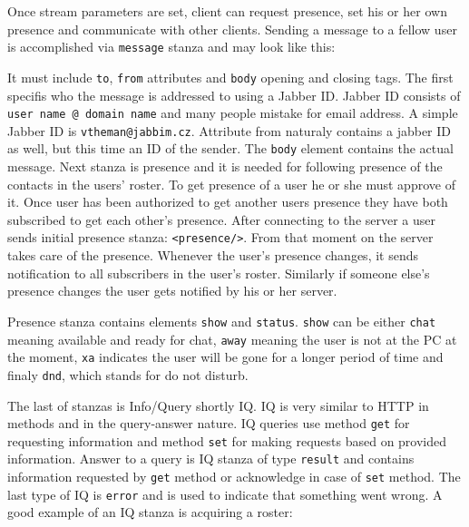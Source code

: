 

Once stream parameters are set, client can request presence, set his or her own presence and communicate with other clients. Sending a message to a fellow user is accomplished via \verb|message| stanza and may look like this:



It must include \verb|to|, \verb|from| attributes and \verb|body| opening and closing tags. The first specifis who the message is addressed to using a Jabber ID. Jabber ID consists of \verb|user name @ domain name| and many people mistake for email address. A simple Jabber ID is \verb|vtheman@jabbim.cz|. Attribute from naturaly contains a jabber ID as well, but this time an ID of the sender. The \verb|body| element contains the actual message. 
Next stanza is presence and it is needed for following presence of the contacts in the users' roster. To get presence of a user he or she must approve of it. Once user has been authorized to get another users presence they have both subscribed to get each other's presence. After connecting to the server a user sends initial presence stanza: \verb|<presence/>|. From that moment on the server takes care of the presence. Whenever the user's presence changes, it sends notification to all subscribers in the user's roster. Similarly if someone else's presence changes the user gets notified by his or her server. 



Presence stanza contains elements \verb|show| and \verb|status|. \verb|show| can be either \verb|chat| meaning available and ready for chat, \verb|away| meaning the user is not at the PC at the moment, \verb|xa| indicates the user will be gone for a longer period of time and finaly \verb|dnd|, which stands for do not disturb.  

The last of stanzas is Info/Query shortly IQ. IQ is very similar to HTTP in methods and in the query-answer nature. IQ queries use method \verb|get| for requesting information and method \verb|set| for making requests based on provided information. Answer to a query is IQ stanza of type \verb|result| and contains information requested by \verb|get| method or acknowledge in case of \verb|set| method. The last type of IQ is \verb|error| and is used to indicate that something went wrong. A good example of an IQ stanza is acquiring a roster: 



